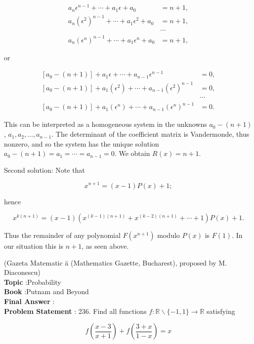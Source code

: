 \documentclass[10pt]{article}
\begin{document}
$$
\begin{aligned}
a_{n} \epsilon^{n-1}+\cdots+a_{1} \epsilon+a_{0} &=n+1, \\
a_{n}\left(\epsilon^{2}\right)^{n-1}+\cdots+a_{1} \epsilon^{2}+a_{0} &=n+1, \\
& \cdots \\
a_{n}\left(\epsilon^{n}\right)^{n-1}+\cdots+a_{1} \epsilon^{n}+a_{0} &=n+1,
\end{aligned}
$$

or

$$
\begin{aligned}
{\left[a_{0}-(n+1)\right]+a_{1} \epsilon+\cdots+a_{n-1} \epsilon^{n-1} } &=0, \\
{\left[a_{0}-(n+1)\right]+a_{1}\left(\epsilon^{2}\right)+\cdots+a_{n-1}\left(\epsilon^{2}\right)^{n-1} } &=0, \\
& \cdots \\
{\left[a_{0}-(n+1)\right]+a_{1}\left(\epsilon^{n}\right)+\cdots+a_{n-1}\left(\epsilon^{n}\right)^{n-1} } &=0 .
\end{aligned}
$$

This can be interpreted as a homogeneous system in the unknowns $a_{0}-(n+1)$, $a_{1}, a_{2}, \ldots, a_{n-1}$. The determinant of the coefficient matrix is Vandermonde, thus nonzero, and so the system has the unique solution $a_{0}-(n+1)=a_{1}=\cdots=a_{n-1}=0$. We obtain $R(x)=n+1$.

Second solution: Note that

$$
x^{n+1}=(x-1) P(x)+1 ;
$$

hence

$$
x^{k(n+1)}=(x-1)\left(x^{(k-1)(n+1)}+x^{(k-2)(n+1)}+\cdots+1\right) P(x)+1 .
$$

Thus the remainder of any polynomial $F\left(x^{n+1}\right)$ modulo $P(x)$ is $F(1)$. In our situation this is $n+1$, as seen above.

(Gazeta Matematic ă (Mathematics Gazette, Bucharest), proposed by M. Diaconescu) 
\\
\textbf{Topic} :Probability\\
\textbf{Book} :Putnam and Beyond\\
\textbf{Final Answer} :\\


\textbf{Problem Statement} :
236. Find all functions $f: \mathbb{R} \backslash\{-1,1\} \rightarrow \mathbb{R}$ satisfying

$$
f\left(\frac{x-3}{x+1}\right)+f\left(\frac{3+x}{1-x}\right)=x
$$
\end{document}
